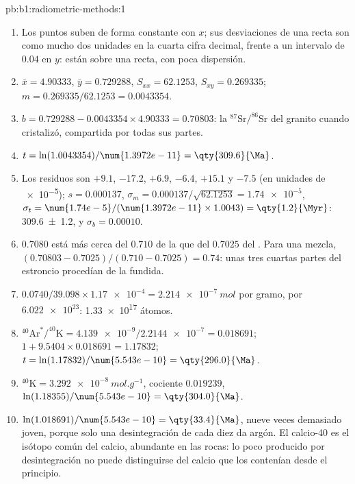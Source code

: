 \begin{solution}{pb:b1:radiometric-methods:1}
\begin{enumerate}
  \item Los puntos suben de forma constante con $x$; sus desviaciones de una recta son como mucho
        dos unidades en la cuarta cifra decimal, frente a un intervalo de $0.04$ en $y$: están sobre una recta, con poca dispersión.
  \item $\bar x = 4.90333$, $\bar y = 0.729288$, $S_{xx} = 62.1253$, $S_{xy} =
        0.269335$; $m = 0.269335/62.1253 = 0.0043354$.
  \item $b = 0.729288 - 0.0043354 \times 4.90333 = 0.70803$: la
        $^{87}\mathrm{Sr}/^{86}\mathrm{Sr}$ del granito cuando cristalizó,
        compartida por todas sus partes.
  \item $t = \ln(1.0043354)/\num{1.3972e-11} = \qty{309.6}{\Ma}$.
  \item Los residuos son $+9.1$, $-17.2$, $+6.9$, $-6.4$, $+15.1$ y $-7.5$ (en
        unidades de \num{e-5}); $s = 0.000137$, $\sigma_m = 0.000137/\sqrt{62.1253} =
        \num{1.74e-5}$, $\sigma_t = \num{1.74e-5}/(\num{1.3972e-11} \times 1.0043)
        = \qty{1.2}{\Myr}$: \qty[uncertainty-mode=separate]{309.6(12)}{\Ma}, y
        $\sigma_b = 0.00010$.
  \item $0.7080$ está más cerca del $0.710$ de la  que del $0.7025$ del .
        Para una mezcla, $(0.70803 - 0.7025)/(0.710 - 0.7025) = 0.74$: unas
        tres cuartas partes del estroncio procedían de la  fundida.
  \item $0.0740/39.098 \times \num{1.17e-4} = \qty{2.214e-7}{mol}$ por gramo,
        por $\num{6.022e23}$: \num{1.33e17} átomos.
  \item $^{40}\mathrm{Ar}^*/^{40}\mathrm{K} = \num{4.139e-9}/\num{2.2144e-7} =
        0.018691$; $1 + 9.5404 \times 0.018691 = 1.17832$; $t =
        \ln(1.17832)/\num{5.543e-10} = \qty{296.0}{\Ma}$.
  \item $^{40}\mathrm{K} = \qty{3.292e-8}{mol.g^{-1}}$, cociente $0.019239$,
        $\ln(1.18355)/\num{5.543e-10} = \qty{304.0}{\Ma}$.
  \item $\ln(1.018691)/\num{5.543e-10} = \qty{33.4}{\Ma}$, nueve veces demasiado joven,
        porque solo una desintegración de cada diez da argón. El calcio-40 es el isótopo común del calcio, abundante en las rocas: lo poco producido por desintegración no puede distinguirse del calcio que los  contenían desde el principio.

\end{enumerate}
\end{solution}
